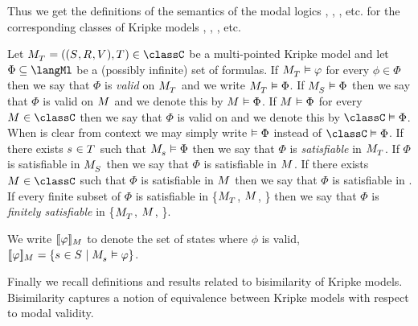 Thus we get the definitions of the semantics of the modal logics \logicK{}, \logicKF{}, \logicKFF{}, etc. for the corresponding classes of Kripke models \classK{}, \classKF{}, \classKFF{}, etc.

Let $\pointedModelAndTuple{\statesT} \in \classC$ be a multi-pointed Kripke model and
let $\Phi \subseteq \langMl$ be a (possibly infinite) set of formulas.
If $\pointedModel{\statesT} \entails \phi$ for every $\phi \in \Phi$ then we say that $\Phi$ is {\em valid} on $\pointedModel{\statesT}$ and we write $\pointedModel{\statesT} \entails \Phi$.
If $\pointedModel{\states} \entails \Phi$ then we say that $\Phi$ is valid on $\model$ and we denote this by $\model \entails \Phi$.
If $\model \entails \Phi$ for every $\model \in \classC$ then we say that $\Phi$ is valid on \classC{} and we denote this by $\classC \entails \Phi$.
When \classC{} is clear from context we may simply write $\vDash \Phi$ instead of $\classC \entails \Phi$.
If there exists $\stateS \in \statesT$ such that $\pointedModel{\stateS} \entails \Phi$ then we say that $\Phi$ is {\em satisfiable} in $\pointedModel{\statesT}$.
If $\Phi$ is satisfiable in $\pointedModel{\states}$ then we say that $\Phi$ is satisfiable in $\model$.
If there exists $\model \in \classC$ such that $\Phi$ is satisfiable in $\model$ then we say that $\Phi$ is satisfiable in \classC{}.
If every finite subset of $\Phi$ is satisfiable in \{$\pointedModel{\statesT}$, $\model$, \classC{}\} then we say that $\Phi$ is {\em finitely satisfiable} in \{$\pointedModel{\statesT}$, $\model$, \classC{}\}.

We write $\interpretation[\model]{\phi}$ to denote the set of states where $\phi$ is valid, $\interpretation[\model]{\phi} = \{\stateS \in \states \mid \pointedModel{\stateS} \entails \phi\}$.

Finally we recall definitions and results related to bisimilarity of Kripke models.
Bisimilarity captures a notion of equivalence between Kripke models with respect to modal validity.

